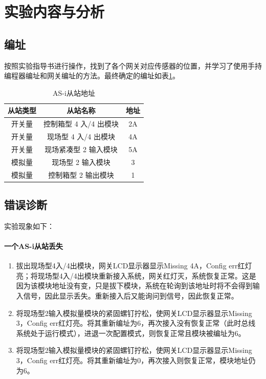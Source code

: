 \section{实验内容与分析}
\subsection{编址}
按照实验指导书进行操作，找到了各个网关对应传感器的位置，并学习了使用手持编程器编址和网关编址的方法。最终确定的编址如表\ref{tab:aa}。

\begin{table}[htbp]
\centering
\begin{tabular}{|c|c|c|}
	\hline
	从站类型 & 从站名称 & 地址 \\
	\hline
	开关量 & 控制箱型 4 入/4 出模块 & 2A \\
	开关量 & 现场型 4 入/4 出模块 & 4A \\
	开关量 & 现场紧凑型 2 输入模块 & 5A \\
	模拟量 & 现场型 2 输入模块 & 3 \\
	模拟量 & 控制箱型 2 输出模块 & 1 \\
	\hline
\end{tabular}
\caption{AS-i从站地址}
\label{tab:aa}
\end{table}

\subsection{错误诊断}
实验现象如下：
\paragraph{一个AS-i从站丢失}
\begin{enumerate}
\item 拔出现场型4入/4出模块，网关LCD显示器显示{\ttfamily Missing 4A}，Config err红灯亮；将现场型4入/4出模块重新接入系统，网关红灯灭，系统恢复正常。这是因为该模块地址没有变，只是拔下模块，系统在轮询到该地址时将不会得到输入信号，因此显示丢失。重新接入后又能询问到信号，因此恢复正常。
\item 将现场型2输入模拟量模块的紧固螺钉拧松，使网关LCD显示器显示{\ttfamily Missing 3}，Config err红灯亮。将其重新编址为6，再次接入没有恢复正常（此时总线系统处于运行模式），进退一次配置模式，则恢复正常且模块被编址为6。
\item 将现场型2输入模拟量模块的紧固螺钉拧松，使网关LCD显示器显示{\ttfamily Missing 3}，Config err红灯亮。将其重新编址为0，再次接入则恢复正常，模块地址仍为6。
\end{enumerate}

